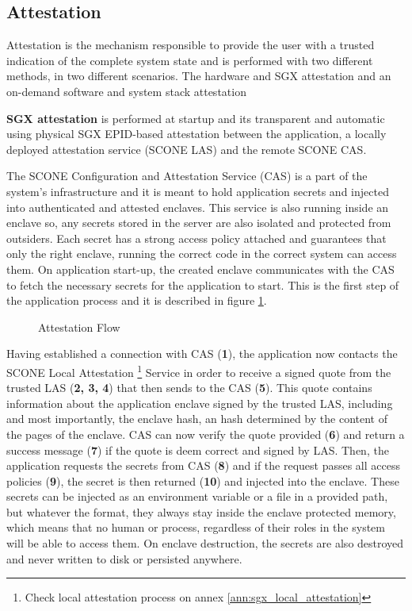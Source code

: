 \subsection{Attestation}
\label{ssec:implementation_of_attestation}

Attestation is the mechanism responsible to provide the user with a trusted indication of the complete system state and is performed with two different methods, in two different scenarios. The hardware and \gls{SGX} attestation and an on-demand software and system stack attestation

\textbf{\gls{SGX} attestation} is performed at startup and its transparent and automatic using physical \gls{SGX} \gls{EPID}-based attestation between the application, a locally deployed attestation service (SCONE \gls{LAS}) and the remote SCONE \gls{CAS}. 

The SCONE Configuration and Attestation Service (\gls{CAS}) is a part of the system's infrastructure and it is meant to hold application secrets and injected into authenticated and attested enclaves. This service is also running inside an enclave so, any secrets stored in the server are also isolated and protected from outsiders. Each secret has a strong access policy attached and guarantees that only the right enclave, running the correct code in the correct system can access them. On application start-up, the created enclave communicates with the CAS to fetch the necessary secrets for the application to start. This is the first step of the application process and it is described in figure \ref{fig:attestation_flow}. 

\begin{figure}[htbp]
  \caption{Attestation Flow}
  \label{fig:attestation_flow}
\end{figure}

Having established a connection with \gls{CAS} (\textbf{1}), the application now contacts the SCONE Local Attestation \footnote{Check local attestation process on annex \ref{ann:sgx_local_attestation}} Service in order to receive a signed quote from the trusted \gls{LAS} (\textbf{2, 3, 4}) that then sends to the \gls{CAS} (\textbf{5}). This quote contains information about the application enclave signed by the trusted \gls{LAS}, including and most importantly, the enclave hash, an hash determined by the content of the pages of the enclave. \gls{CAS} can now verify the quote provided (\textbf{6}) and return a success message (\textbf{7}) if the quote is deem correct and signed by \gls{LAS}. Then, the application requests the secrets from \gls{CAS} (\textbf{8}) and if the request passes all access policies (\textbf{9}), the secret is then returned (\textbf{10}) and injected into the enclave. These secrets can be injected as an environment variable or a file in a provided path, but whatever the format, they always stay inside the enclave protected memory, which means that no human or process, regardless of their roles in the system will be able to access them. On enclave destruction, the secrets are also destroyed and never written to disk or persisted anywhere. 

